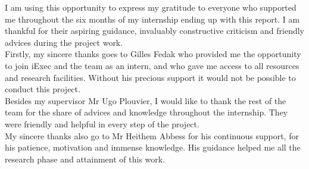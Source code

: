 
\begin{acknowledgements}      

    I am using this opportunity to express my gratitude to everyone who supported me throughout the six months 
    of my internship ending up with this report. I am thankful for their aspiring guidance, invaluably
    constructive criticism and friendly advices during the project work.\\
    Firstly, my sincere thanks  goes to Gilles Fedak who provided me the opportunity to join iExec
    and the team as an intern, and who gave me access to all resources and research facilities. Without his
    precious support it would not be possible to conduct this project.\\
    Besides my supervisor Mr Ugo Plouvier, I would like to thank the rest of the team for the share of advices
    and knowledge throughout the internship. They were friendly and helpful in every step of the project.\\
    My sincere thanks also go to Mr Heithem Abbess for his continuous support, for his patience, motivation 
    and immense knowledge. His guidance helped me all the research phase and attainment of this work.


\end{acknowledgements}
